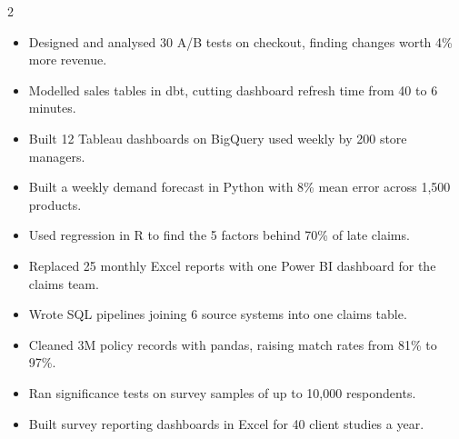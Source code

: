 \documentclass[10pt,a4paper,withhyper]{altacv}
\begin{document}


\makecvheader


\begin{paracol}{2}

\begin{itemize}
\item Designed and analysed 30 A/B tests on checkout, finding changes worth 4\% more revenue. %
\item Modelled sales tables in dbt, cutting dashboard refresh time from 40 to 6 minutes. %
\item Built 12 Tableau dashboards on BigQuery used weekly by 200 store managers. %
\item Built a weekly demand forecast in Python with 8\% mean error across 1,500 products. %
\end{itemize}

\divider

\begin{itemize}
\item Used regression in R to find the 5 factors behind 70\% of late claims. %
\item Replaced 25 monthly Excel reports with one Power BI dashboard for the claims team. %
\item Wrote SQL pipelines joining 6 source systems into one claims table. %
\item Cleaned 3M policy records with pandas, raising match rates from 81\% to 97\%. %
\end{itemize}

\divider

\begin{itemize}
\item Ran significance tests on survey samples of up to 10,000 respondents. %
\item Built survey reporting dashboards in Excel for 40 client studies a year. %
\end{itemize}


\end{paracol}
\end{document}
